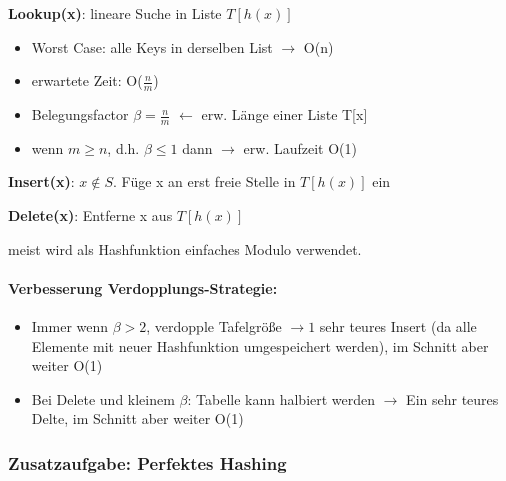 \documentclass[10pt,a4paper]{article}
\begin{document}
\textbf{Lookup(x)}: lineare Suche in Liste $T[h(x)]$ \\ 
\begin{itemize}
	\item Worst Case: alle Keys in derselben List $\rightarrow$ O(n)
	\item erwartete Zeit: O($\frac{n}{m}$)
	\item Belegungsfactor $\beta = \frac{n}{m}$ $\leftarrow$ erw. Länge einer Liste T[x]
	\item wenn $m \geq n$, d.h. $\beta \leq 1$ dann $\rightarrow$ erw. Laufzeit O(1)
\end{itemize}


\textbf{Insert(x)}: $x\notin S.$ Füge x an erst freie Stelle in $T[h(x)]$ ein

\textbf{Delete(x)}: Entferne x aus $T[h(x)]$

\begin{center}
	\resizebox{.6\columnwidth}{!}{
		
	}
\end{center}
meist wird als Hashfunktion einfaches Modulo verwendet.

\paragraph*{Verbesserung Verdopplungs-Strategie:}
\begin{itemize}
	\item Immer wenn $\beta>2$, verdopple Tafelgröße $\rightarrow1$ sehr teures Insert (da alle Elemente mit neuer Hashfunktion umgespeichert werden), im Schnitt aber weiter O(1)\\ 
	\item Bei Delete und kleinem $\beta$: Tabelle kann halbiert werden $\rightarrow$ Ein sehr teures Delte, im Schnitt aber weiter O(1)
\end{itemize}

\subsubsection*{Zusatzaufgabe: Perfektes Hashing}
\end{document}

